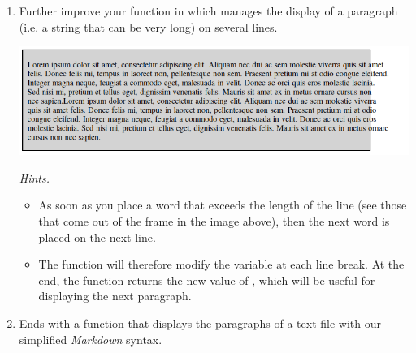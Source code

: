 \documentclass[11pt,class=report,crop=false]{standalone}
\begin{document}
\begin{activite}
\begin{enumerate}
   
  \item Further improve your function in  which manages the display of a paragraph (i.e. a string that can be very long) on several lines.
  
\begin{center}
\includegraphics[scale=0.55]{screen-markdown-6-en}
\end{center}   
 
   \emph{Hints.}
  \begin{itemize}
    \item As soon as you place a word that exceeds the length of the line (see those that come out of the frame in the image above), then the next word is placed on the next line.
    
    \item The function will therefore modify the variable  at each line break. At the end, the function returns the new value of , which will be useful for displaying the next paragraph.
 
   \end{itemize}    
   
   \item Ends with a function  that displays the paragraphs of a text file with our simplified \emph{Markdown} syntax.
\end{enumerate} 
\end{activite}

\end{document}
